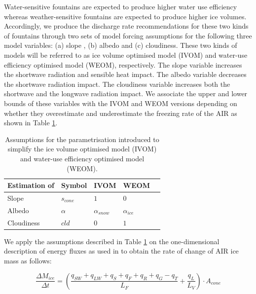 \documentclass[tc, manuscript]{copernicus}
\begin{document}
Water-sensitive fountains are expected to produce higher water use efficiency whereas weather-sensitive fountains
are expected to produce higher ice volumes. Accordingly, we produce the discharge rate recommendations for these
two kinds of fountains through two sets of model forcing assumptions for the following three model variables:
(a) slope , (b) albedo and (c) cloudiness.  These two kinds of models will be referred to as ice volume
optimised model (IVOM) and water-use efficiency optimised model (WEOM), respectively. The slope variable
increases the shortwave radiation and sensible heat impact. The albedo variable decreases the shortwave
radiation impact. The cloudiness variable increases both the shortwave and the longwave radiation impact. We
associate the upper and lower bounds of these variables with the IVOM and WEOM versions depending on whether
they overestimate and underestimate the freezing rate of the AIR as shown in Table \ref{tab:assumptions}.

\begin{table}[]
\centering
\caption{Assumptions for the parametrisation introduced to simplify the ice volume optimised model (IVOM) and
water-use efficiency optimised model (WEOM).}
\label{tab:assumptions}
\begin{tabular}{@{}lllll@{}}
\toprule
\textbf{Estimation of} & \textbf{Symbol} & \textbf{IVOM} & \textbf{WEOM} & \\ \midrule
\multicolumn{1}{|l}{Slope}        & $s_{cone}$ & $ 1 $ & $0$ & \multicolumn{1}{l|}{} \\ \midrule
\multicolumn{1}{|l}{Albedo} & $\alpha$ & $\alpha_{snow}$ & $\alpha_{ice}$ & \multicolumn{1}{l|}{} \\\midrule 
\multicolumn{1}{|l}{Cloudiness}  & $cld$ & $0$ & $1$ & \multicolumn{1}{l|}{} \\ \bottomrule
\end{tabular}
\end{table}

We apply the assumptions described in Table \ref{tab:assumptions} on the one-dimensional description of energy
fluxes as used in \cite{balasubramanianInfluenceMeteorologicalConditions2022} to obtain the rate of change of
AIR ice mass as follows: 

\begin{equation}
  \frac{\Delta M_{ice}}{\Delta t}  =  (\frac{q_{SW} + q_{LW} + q_{S} + q_{F} + q_{R} + q_{G} - q_{T}}{L_F} + \frac{q_{L}}{L_V} ) \cdot A_{cone}
	\label{eqn:auto}
\end{equation}
\end{document}
